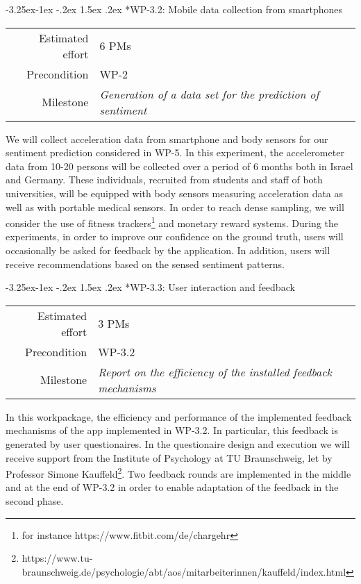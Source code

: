 \documentclass[12pt]{article}
\makeatletter
\newcommand{\kobyc}[1]{\begin{center}\fbox{\parbox{3in}{{\textcolor{green}{K: #1}}}}\end{center}}
\renewcommand\paragraph{\@startsection{paragraph}{4}{\z@}%
  {-3.25ex\@plus -1ex \@minus -.2ex}%
  {1.5ex \@plus .2ex}%
  {\normalfont\normalsize\bfseries}}
\makeatother
\begin{document}
\paragraph*{WP-3.2: Mobile data collection from smartphones}
\begin{tabular}{rl}
 Estimated effort& 6 PMs\\
 Precondition & WP-2\\
 Milestone & \begin{minipage}[t]{12.2cm}
\textit{Generation of a data set for the prediction of sentiment}\vspace{.2cm}
             \end{minipage}
\end{tabular}

\noindent
We will collect acceleration data from smartphone and body sensors for our sentiment prediction considered in WP-5. 
In this experiment, the accelerometer data from 10-20 persons will be collected over a period of 6 months both in Israel and Germany. 
These individuals, recruited from students and staff of both universities, will be equipped with body sensors measuring acceleration data as well as with portable medical sensors. 
In order to reach dense sampling, we will consider the use of fitness trackers\footnote{for instance https://www.fitbit.com/de/chargehr} and monetary reward systems. 
During the experiments, in order to improve our confidence on the ground truth, users will occasionally be asked for feedback by the application.
In addition, users will receive recommendations based on the sensed sentiment patterns. 


\paragraph*{WP-3.3: User interaction and feedback}
\begin{tabular}{rl}
 Estimated effort& 3 PMs\\
 Precondition & WP-3.2\\
 Milestone & \begin{minipage}[t]{12.2cm}
\textit{Report on the efficiency of the installed feedback mechanisms}\vspace{.2cm}
             \end{minipage}
\end{tabular}

\noindent
In this workpackage, the efficiency and performance of the implemented feedback mechanisms of the app implemented in WP-3.2.
In particular, this feedback is generated by user questionaires.
In the questionaire design and execution we will receive support from the Institute of Psychology at TU Braunschweig, let by Professor Simone Kauffeld\footnote{https://www.tu-braunschweig.de/psychologie/abt/aos/mitarbeiterinnen/kauffeld/index.html}.
Two feedback rounds are implemented in the middle and at the end of WP-3.2 in order to enable adaptation of the feedback in the second phase. 
\end{document}
